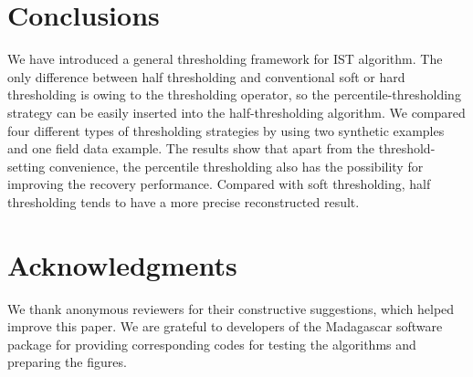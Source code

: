 


\section{Conclusions}
We have introduced a general thresholding framework for IST algorithm. The only difference between half thresholding and conventional soft or hard thresholding is owing to the thresholding operator, so the percentile-thresholding strategy can be easily inserted into the half-thresholding algorithm. We compared four different types of thresholding strategies by using two synthetic examples and one field data example. The results show that apart from the threshold-setting convenience, the percentile thresholding also has the possibility for improving the recovery performance. Compared with soft thresholding, half thresholding tends to have a more precise reconstructed result.

\section{Acknowledgments}
We thank   anonymous reviewers for their constructive suggestions, which helped improve this paper. We are grateful to developers of the Madagascar software package for providing corresponding codes for testing the algorithms and preparing the figures. 
















